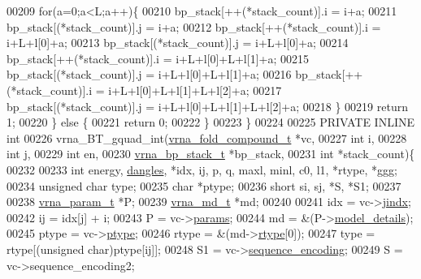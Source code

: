 \begin{DoxyCode}
00209     \textcolor{keywordflow}{for}(a=0;a<L;a++)\{
00210       bp\_stack[++(*stack\_count)].i = i+a;
00211       bp\_stack[(*stack\_count)].j   = i+a;
00212       bp\_stack[++(*stack\_count)].i = i+L+l[0]+a;
00213       bp\_stack[(*stack\_count)].j   = i+L+l[0]+a;
00214       bp\_stack[++(*stack\_count)].i = i+L+l[0]+L+l[1]+a;
00215       bp\_stack[(*stack\_count)].j   = i+L+l[0]+L+l[1]+a;
00216       bp\_stack[++(*stack\_count)].i = i+L+l[0]+L+l[1]+L+l[2]+a;
00217       bp\_stack[(*stack\_count)].j   = i+L+l[0]+L+l[1]+L+l[2]+a;
00218     \}
00219     \textcolor{keywordflow}{return} 1;
00220   \} \textcolor{keywordflow}{else} \{
00221     \textcolor{keywordflow}{return} 0;
00222   \}
00223 \}
00224 
00225 PRIVATE INLINE \textcolor{keywordtype}{int}
00226 vrna\_BT\_gquad\_int(\hyperlink{group__fold__compound_structvrna__fc__s}{vrna\_fold\_compound\_t} *vc,
00227                   \textcolor{keywordtype}{int} i,
00228                   \textcolor{keywordtype}{int} j,
00229                   \textcolor{keywordtype}{int} en,
00230                   \hyperlink{group__data__structures_structvrna__bp__stack__s}{vrna\_bp\_stack\_t} *bp\_stack,
00231                   \textcolor{keywordtype}{int} *stack\_count)\{
00232 
00233   \textcolor{keywordtype}{int}           energy, \hyperlink{group__model__details_ga72b511ed1201f7e23ec437e468790d74}{dangles}, *idx, ij, p, q, maxl, minl, c0, l1, *rtype, *ggg;
00234   \textcolor{keywordtype}{unsigned} \textcolor{keywordtype}{char} type;
00235   \textcolor{keywordtype}{char}          *ptype;
00236   \textcolor{keywordtype}{short}         si, sj, *S, *S1;
00237 
00238   \hyperlink{group__energy__parameters_structvrna__param__s}{vrna\_param\_t}  *P;
00239   \hyperlink{group__model__details_structvrna__md__s}{vrna\_md\_t}     *md;
00240 
00241   idx         = vc->\hyperlink{group__fold__compound_a5037235dee512efd85ca543780bbca1a}{jindx};
00242   ij          = idx[j] + i;
00243   P           = vc->\hyperlink{group__fold__compound_a19b8720c2c5321c1b97c830bd17566ea}{params};
00244   md          = &(P->\hyperlink{group__energy__parameters_a7b84353eb9075c595bad4ceb871bcae7}{model\_details});
00245   ptype       = vc->\hyperlink{group__fold__compound_a3fbea559f1d1976b2d67c215cdeee0b2}{ptype};
00246   rtype       = &(md->\hyperlink{group__model__details_ad082d0fea31e002b90cdfe5e6382f8b0}{rtype}[0]);
00247   type        = rtype[(\textcolor{keywordtype}{unsigned} char)ptype[ij]];
00248   S1          = vc->\hyperlink{group__fold__compound_a9934bdb695d35a3544285cbcc19f9763}{sequence\_encoding};
00249   S           = vc->sequence\_encoding2;

\end{DoxyCode}
